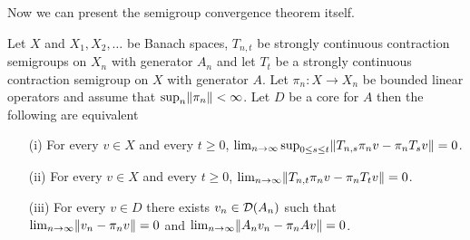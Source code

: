 Now we can present the semigroup convergence theorem itself.

\begin{thm}\label{KurtzSovaSemigroupConvergence}Let $X$ and $X_1, X_2, \dotsc$ be Banach spaces, $T_{n,t}$ be strongly continuous contraction semigroups on $X_n$ with generator $A_n$ and let $T_t$ be a strongly continuous contraction semigroup on $X$ with generator $A$.  Let $\pi_n : X \to X_n$ be bounded linear operators and assume that $\sup_{n} \lVert \pi_n \rVert < \infty$.  Let $D$ be a
core for $A$ then the following are equivalent
\begin{itemize}
\item[(i)]For every $v \in X$ and every $t \geq 0$,  $\lim_{n \to \infty} \sup_{0 \leq s \leq t} \lVert T_{n,s} \pi_n v - \pi_n T_s v \rVert = 0$.
\item[(ii)]For every $v \in X$ and every $t \geq 0$,  $\lim_{n \to \infty} \lVert T_{n,t} \pi_n v - \pi_n T_t v \rVert = 0$.
\item[(iii)] For every $v \in D$ there exists $v_n \in \mathcal{D}(A_n)$ such that $\lim_{n \to \infty} \lVert v_n - \pi_n v \rVert = 0$ and $\lim_{n \to \infty} \lVert A_n v_n - \pi_n A v \rVert = 0$.
\end{itemize}
\end{thm}
